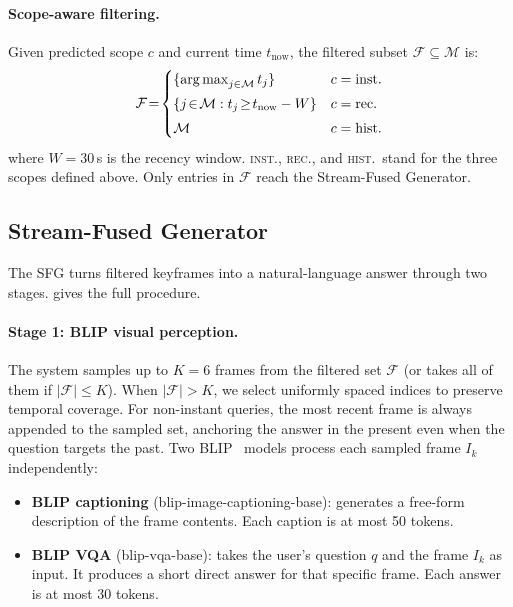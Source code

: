 \paragraph{Scope-aware filtering.}
Given predicted scope $c$ and current time $t_{\text{now}}$, the filtered subset $\mathcal{F} \subseteq \mathcal{M}$ is:
\begin{equation}
  \mathcal{F} \!=\!
  \begin{cases}
    \{\operatorname*{arg\,max}_{j \in \mathcal{M}} t_j\}                        & c = \text{inst.} \\[3pt]
    \{j \!\in\! \mathcal{M} : t_j \!\ge\! t_{\text{now}} - W\} & c = \text{rec.}  \\[3pt]
    \mathcal{M}                                                 & c = \text{hist.}
  \end{cases}
  \label{eq:scope_filter}
\end{equation}
where $W = 30$\,s is the recency window. \textsc{inst.}, \textsc{rec.}, and \textsc{hist.}\ stand for the three scopes defined above. Only entries in $\mathcal{F}$ reach the Stream-Fused Generator.


\subsection{Stream-Fused Generator}
\label{sec:sfg}

The SFG turns filtered keyframes into a natural-language answer through two stages.  gives the full procedure.

\paragraph{Stage 1: BLIP visual perception.}
The system samples up to $K\!=\!6$ frames from the filtered set $\mathcal{F}$ (or takes all of them if $|\mathcal{F}| \le K$).
When $|\mathcal{F}| > K$, we select uniformly spaced indices to preserve temporal coverage.
For non-instant queries, the most recent frame is always appended to the sampled set, anchoring the answer in the present even when the question targets the past.
Two BLIP~\cite{li2022blip} models process each sampled frame $I_k$ independently:

\begin{itemize}[itemsep=2pt]
  \item \textbf{BLIP captioning} (blip-image-captioning-base): generates a free-form description of the frame contents. Each caption is at most 50 tokens.
  \item \textbf{BLIP VQA} (blip-vqa-base): takes the user's question $q$ and the frame $I_k$ as input. It produces a short direct answer for that specific frame. Each answer is at most 30 tokens.
\end{itemize}

